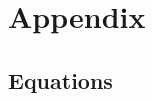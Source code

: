 \documentclass{article}
\begin{document}
\section{Appendix}
\label{sec:appendix}

\subsection*{Equations}

\end{document}
